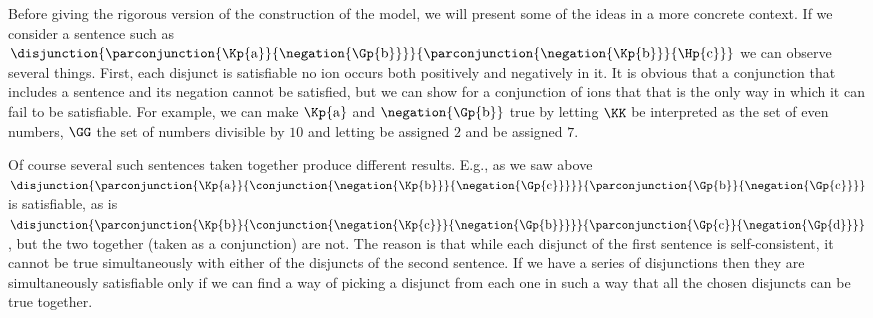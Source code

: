 Before giving the rigorous version of the construction of the model, we will present some of the ideas in a more concrete context. 
If we consider a sentence such as $\disjunction{\parconjunction{\Kp{\constant{a}}}{\negation{\Gp{\constant{b}}}}}{\parconjunction{\negation{\Kp{\constant{b}}}}{\Hp{\constant{c}}}}$ we can observe several things. 
First, each disjunct is satisfiable \Iff no ion occurs both positively and negatively in it. 
It is obvious that a conjunction that includes a sentence and its negation cannot be satisfied, but we can show for a conjunction of ions that that is the only way in which it can fail to be satisfiable. 
For example, we can make $\Kp{\constant{a}}$ and $\negation{\Gp{\constant{b}}}$ true by letting $\KK$ be interpreted as the set of even numbers, $\GG$ the set of numbers divisible by $10$ and letting  be assigned $2$ and  be assigned $7$. 

Of course several such sentences taken together produce different results. E.g., as we saw above $\disjunction{\parconjunction{\Kp{\constant{a}}}{\conjunction{\negation{\Kp{\constant{b}}}}{\negation{\Gp{\constant{c}}}}}}{\parconjunction{\Gp{\constant{b}}}{\negation{\Gp{\constant{c}}}}}$ is satisfiable, as is $\disjunction{\parconjunction{\Kp{\constant{b}}}{\conjunction{\negation{\Kp{\constant{c}}}}{\negation{\Gp{\constant{b}}}}}}{\parconjunction{\Gp{\constant{c}}}{\negation{\Gp{\constant{d}}}}}$, but the two together (taken as a conjunction) are not.
The reason is that while each disjunct of the first sentence is self-consistent, it cannot be true simultaneously with either of the disjuncts of the second sentence. If we have a series of disjunctions then they are simultaneously satisfiable only if we can find a way of picking a disjunct from each one in such a way that all the chosen disjuncts can be true together.

